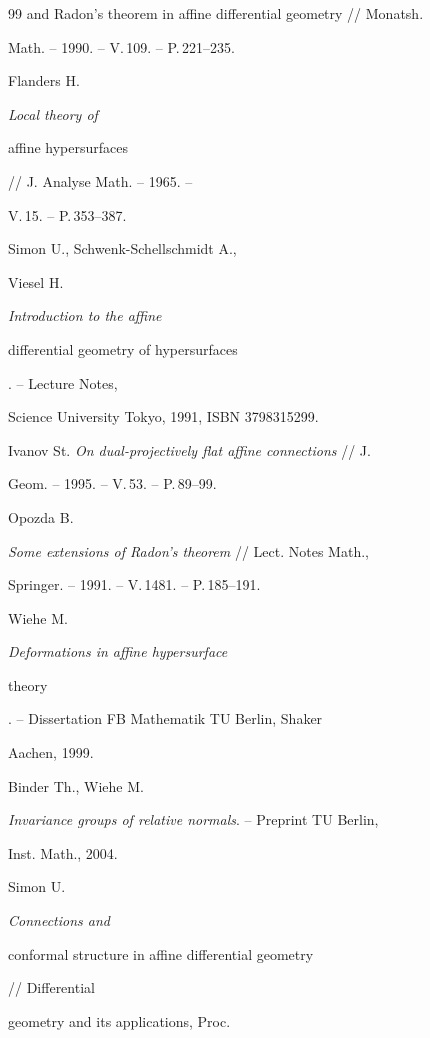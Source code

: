\begin{thebibliography}{99}
{and Radon's theorem in affine differential geometry} // Monatsh.

Math. -- 1990. -- V.\,109. -- P.\,221--235.




Flanders H. {\it Local theory of

affine hypersurfaces} // J. Analyse Math. -- 1965. --

V.\,15. -- P.\,353--387.




Simon U., Schwenk-Schellschmidt A.,

Viesel H. {\it Introduction to the affine

differential geometry of hypersurfaces}. -- Lecture Notes,

Science University Tokyo, 1991, ISBN 3798315299.




Ivanov St. {\it On dual-projectively flat affine connections} // J.

Geom. -- 1995. -- V.\,53. -- P.\,89--99.




Opozda B.

{\it Some extensions of Radon's theorem} // Lect. Notes Math.,

Springer. -- 1991. -- V.\,1481. -- P.\,185--191.




Wiehe M. {\it Deformations in affine hypersurface

theory}. -- Dissertation FB Mathematik TU Berlin, Shaker

Aachen, 1999.




Binder Th.,  Wiehe M.

{\it Invariance groups of relative normals}. -- Preprint TU Berlin,

Inst. Math., 2004.




Simon U. {\it Connections and

conformal structure in affine differential geometry} // Differential

geometry and its applications, Proc.


\end{thebibliography}
